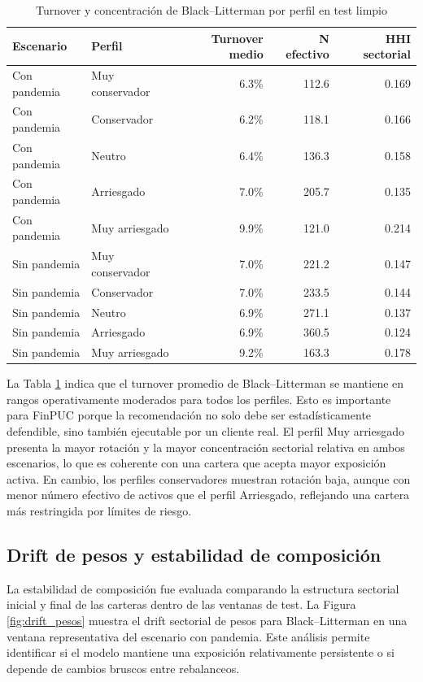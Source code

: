 \documentclass[11pt]{article}
\begin{document}
\begin{table}[H]
\centering
\caption{Turnover y concentraci\'on de Black--Litterman por perfil en test limpio}
\label{tab:turnover}
\begin{tabular}{l l r r r}
\toprule
Escenario & Perfil & Turnover medio & N efectivo & HHI sectorial \\
\midrule
Con pandemia & Muy conservador & 6.3\% & 112.6 & 0.169 \\
Con pandemia & Conservador & 6.2\% & 118.1 & 0.166 \\
Con pandemia & Neutro & 6.4\% & 136.3 & 0.158 \\
Con pandemia & Arriesgado & 7.0\% & 205.7 & 0.135 \\
Con pandemia & Muy arriesgado & 9.9\% & 121.0 & 0.214 \\
\midrule
Sin pandemia & Muy conservador & 7.0\% & 221.2 & 0.147 \\
Sin pandemia & Conservador & 7.0\% & 233.5 & 0.144 \\
Sin pandemia & Neutro & 6.9\% & 271.1 & 0.137 \\
Sin pandemia & Arriesgado & 6.9\% & 360.5 & 0.124 \\
Sin pandemia & Muy arriesgado & 9.2\% & 163.3 & 0.178 \\
\bottomrule
\end{tabular}
\end{table}

La Tabla \ref{tab:turnover} indica que el turnover promedio de Black--Litterman se mantiene en rangos operativamente moderados para todos los perfiles. Esto es importante para FinPUC porque la recomendaci\'on no solo debe ser estad\'isticamente defendible, sino tambi\'en ejecutable por un cliente real. El perfil Muy arriesgado presenta la mayor rotaci\'on y la mayor concentraci\'on sectorial relativa en ambos escenarios, lo que es coherente con una cartera que acepta mayor exposici\'on activa. En cambio, los perfiles conservadores muestran rotaci\'on baja, aunque con menor n\'umero efectivo de activos que el perfil Arriesgado, reflejando una cartera m\'as restringida por l\'imites de riesgo.

\subsection{Drift de pesos y estabilidad de composici\'on}

La estabilidad de composici\'on fue evaluada comparando la estructura sectorial inicial y final de las carteras dentro de las ventanas de test. La Figura \ref{fig:drift_pesos} muestra el drift sectorial de pesos para Black--Litterman en una ventana representativa del escenario con pandemia. Este an\'alisis permite identificar si el modelo mantiene una exposici\'on relativamente persistente o si depende de cambios bruscos entre rebalanceos.
\end{document}
